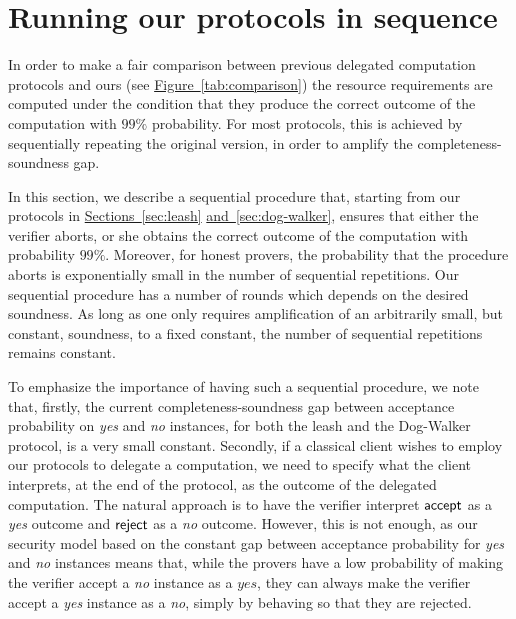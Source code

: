 \documentclass[11pt]{article}
\numberwithin{equation}{section}
\theoremstyle{definition}
\theoremstyle{plain}
\newcommand{\expref}[2]{\hyperref[#2]{#1~\ref{#2}}}
\begin{document}
 

\section{Running our protocols in sequence}
\label{sec:sequential}

In order to make a fair comparison between previous delegated computation protocols and ours (see \expref{Figure}{tab:comparison}) the resource requirements are computed under the condition that they produce the correct outcome of the computation with $99\%$ probability. For most protocols, this is achieved by sequentially repeating the original version, in order to amplify the completeness-soundness gap. 

In this section, we describe a sequential procedure that, starting from our protocols in \expref{Sections}{sec:leash} \expref{and}{sec:dog-walker}, ensures that either the verifier aborts, or she obtains the correct outcome of the computation with probability $99\%$. Moreover, for honest provers, the probability that the procedure aborts is exponentially small in the number of sequential repetitions. Our sequential procedure has a number of rounds which depends on the desired soundness. As long as one only requires amplification of an arbitrarily small, but constant, soundness, to a fixed constant, the number of sequential repetitions remains constant.

To emphasize the importance of having such a sequential procedure, we note that, firstly, the current completeness-soundness gap between acceptance probability on \textit{yes} and \textit{no} instances, for both the leash and the Dog-Walker protocol, is a very small constant. Secondly, if a classical client wishes to employ our protocols to delegate a computation, we need to specify what the client interprets, at the end of the protocol, as the outcome of the delegated computation. The natural approach is to have the verifier interpret $\sf accept$ as a \textit{yes} outcome and $\sf reject$ as a \textit{no} outcome. However, this is not enough, as our security model based on the constant gap between acceptance probability for \textit{yes} and \textit{no} instances means that, while the provers have a low probability of making the verifier accept a \textit{no} instance as a $\textit{yes}$, they can always make the verifier accept a \textit{yes} instance as a \textit{no}, simply by behaving so that they are rejected.
\end{document}

